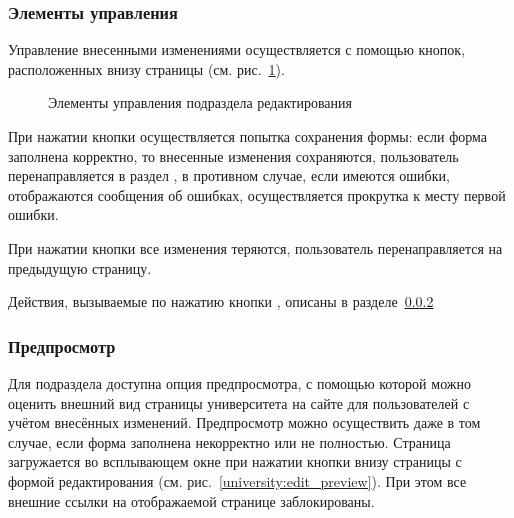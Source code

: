 	\subsubsection{Элементы управления}\label{university:edit_save_cancel}
Управление внесенными изменениями осуществляется с помощью кнопок, расположенных внизу страницы (см. рис.~\ref{university:edit_buttons}).
		\begin{figure}[H]
		\caption{Элементы управления подраздела редактирования}
		\label{university:edit_buttons}
		\end{figure}	
		
При нажатии кнопки  осуществляется попытка сохранения формы: если форма заполнена корректно, то внесенные изменения сохраняются, пользователь перенаправляется в раздел , в противном случае, если имеются ошибки, отображаются сообщения об ошибках, осуществляется прокрутка к месту первой ошибки. 


При нажатии кнопки  все изменения теряются, пользователь перенаправляется на предыдущую страницу.


Действия, вызываемые по нажатию кнопки , описаны в разделе~\ref{university:edit_preview_ch}
	
	\subsubsection{Предпросмотр}\label{university:edit_preview_ch}
	Для подраздела  доступна опция предпросмотра, с помощью которой можно оценить внешний вид страницы университета на сайте для пользователей с учётом внесённых изменений. Предпросмотр можно осуществить даже в том случае, если форма заполнена некорректно или не полностью. Страница загружается во всплывающем окне при нажатии кнопки  внизу страницы с формой редактирования (см. рис.~\ref{university:edit_preview}). При этом все внешние ссылки на отображаемой странице заблокированы.
	
